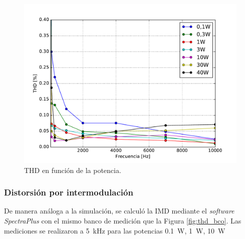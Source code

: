 		\begin{figure}[H]
			\centering
			\includegraphics[scale=0.6]{./Figuras/thd_zoom.pdf}
			\caption{THD en función de la potencia.}
		\end{figure}



%
%
%
%
		\subsubsection{Distorsión por intermodulación}

		De manera análoga a la simulación, se calculó la IMD mediante el \textit{software SpectraPlus} con el mismo banco de medición que la Figura \ref{fig:thd_bco}. Las mediciones se realizaron a \SI{5}{\kilo\hertz} para las potencias \SI{0.1}{\watt}, \SI{1}{\watt}, \SI{10}{\watt}

